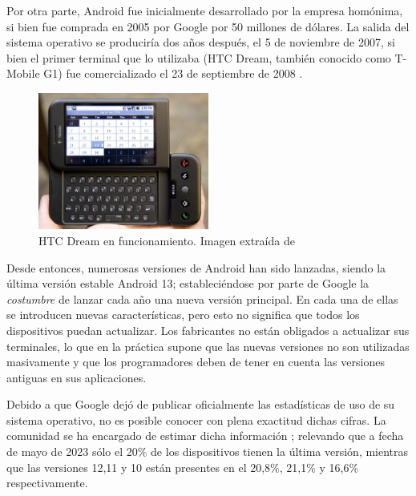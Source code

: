        Por otra parte, Android fue inicialmente desarrollado por la empresa homónima, si bien fue comprada en 2005
        por Google por 50 millones de dólares. La salida del sistema operativo se produciría dos años después, el 5 
        de noviembre de 2007, si bien el primer terminal que lo utilizaba (HTC Dream, también conocido como 
        T-Mobile G1) fue comercializado el 23 de septiembre de 2008 \cite{adeva_android_2023} \cite{marquez_asi_2022}.

        \begin{figure}[h]
            \centering
            \includegraphics[width=0.5\textwidth]{figures/HTC Dream.jpg}
            \caption[HTC Dream en funcionamiento.]{HTC Dream en funcionamiento. Imagen extraída de \cite{oryl_t-mobile_2008}}
            \label{figure:android:htc_dream}
        \end{figure}

        Desde entonces, numerosas versiones de Android han sido lanzadas, siendo la última versión estable Android 
        13; estableciéndose por parte de Google la \textit{costumbre} de lanzar cada año una nueva versión principal. 
        En cada una de ellas se introducen nuevas características, pero esto no significa que todos los dispositivos 
        puedan actualizar. Los fabricantes no están obligados a actualizar sus terminales, lo que en la práctica 
        supone que las nuevas versiones no son utilizadas masivamente y que los programadores deben de tener en 
        cuenta las versiones antiguas en sus aplicaciones. 
        

        Debido a que Google dejó de publicar oficialmente las estadísticas de uso de su sistema operativo, no es
        posible conocer con plena exactitud dichas cifras. La comunidad se ha encargado de estimar dicha 
        información \cite{belinski_android_nodate}; relevando que a fecha de mayo de 2023 sólo el 20\% de los 
        dispositivos tienen la última versión, mientras que las versiones 12,11 y 10 están presentes en el 
        20,8\%, 21,1\% y 16,6\% respectivamente. 

